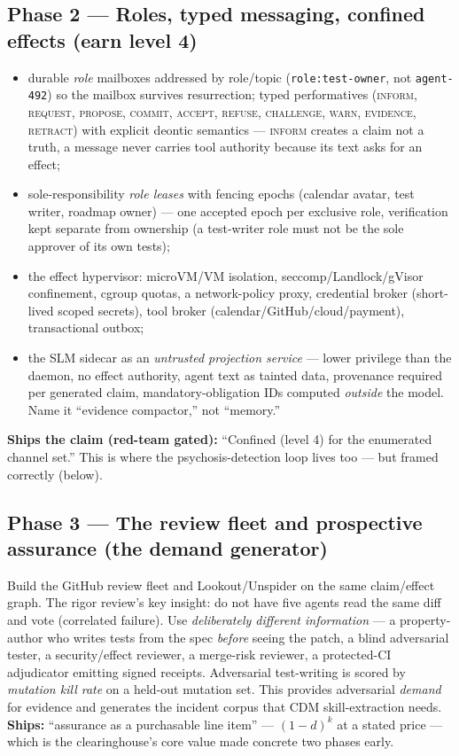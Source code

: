 \documentclass[11pt,a4paper]{article}
\begin{document}
\subsection*{Phase 2 --- Roles, typed messaging, confined effects (earn level 4)}
\begin{itemize}
\item durable \emph{role} mailboxes addressed by role/topic (\texttt{role:test-owner}, not \texttt{agent-492}) so the mailbox survives resurrection; typed performatives (\textsc{inform, request, propose, commit, accept, refuse, challenge, warn, evidence, retract}) with explicit deontic semantics --- \textsc{inform} creates a claim not a truth, a message never carries tool authority because its text asks for an effect;
\item sole-responsibility \emph{role leases} with fencing epochs (calendar avatar, test writer, roadmap owner) --- one accepted epoch per exclusive role, verification kept separate from ownership (a test-writer role must not be the sole approver of its own tests);
\item the effect hypervisor: microVM/VM isolation, seccomp/Landlock/gVisor confinement, cgroup quotas, a network-policy proxy, credential broker (short-lived scoped secrets), tool broker (calendar/GitHub/cloud/payment), transactional outbox;
\item the SLM sidecar as an \emph{untrusted projection service} --- lower privilege than the daemon, no effect authority, agent text as tainted data, provenance required per generated claim, mandatory-obligation IDs computed \emph{outside} the model. Name it ``evidence compactor,'' not ``memory.''
\end{itemize}
\textbf{Ships the claim (red-team gated):} ``Confined (level 4) for the enumerated channel set.'' This is where the psychosis-detection loop lives too --- but framed correctly (below).

\subsection*{Phase 3 --- The review fleet and prospective assurance (the demand generator)}
Build the GitHub review fleet and Lookout/Unspider on the same claim/effect graph. The rigor review's key insight: do not have five agents read the same diff and vote (correlated failure). Use \emph{deliberately different information} --- a property-author who writes tests from the spec \emph{before} seeing the patch, a blind adversarial tester, a security/effect reviewer, a merge-risk reviewer, a protected-CI adjudicator emitting signed receipts. Adversarial test-writing is scored by \emph{mutation kill rate} on a held-out mutation set. This provides adversarial \emph{demand} for evidence and generates the incident corpus that CDM skill-extraction needs. \textbf{Ships:} ``assurance as a purchasable line item'' --- $(1-d)^k$ at a stated price --- which is the clearinghouse's core value made concrete two phases early.
\end{document}

